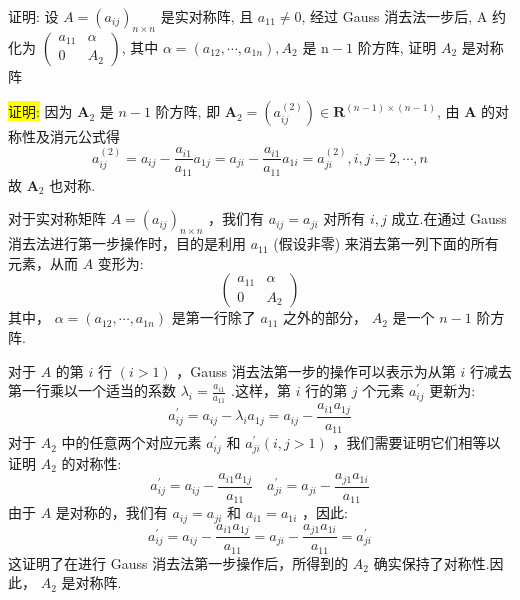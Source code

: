 \begin{tcolorbox}[breakable,enhanced,arc=0mm,outer arc=0mm,
		boxrule=0pt,toprule=1pt,leftrule=0pt,bottomrule=1pt, rightrule=0pt,left=0.2cm,right=0.2cm,
		titlerule=0.5em,toptitle=0.1cm,bottomtitle=-0.1cm,top=0.2cm,
		colframe=white!10!biru,colback=white!90!biru,coltitle=white,
            coltext=black,title =2024-04-02, title style={white!10!biru}, before skip=8pt, after skip=8pt,before upper=\hspace{2em},
		fonttitle=\bfseries,fontupper=\normalsize]
  
证明: 设 $ A=\left(a_{i j}\right)_{n \times n} $ 是实对称阵, 且 $ a_{11} \neq 0 $, 经过 Gauss 消去法一步后, A 约化为 $ \left(\begin{array}{cc}a_{11} & \alpha \\ 0 & A_{2}\end{array}\right) $, 其中 $ \alpha=\left(a_{12}, \cdots, a_{1 n}\right), A_{2} $ 是 $ \mathrm{n}-1 $ 阶方阵, 证明 $ A_{2} $ 是对称阵


\colorbox{yellow}{证明:} 因为 $ \boldsymbol{A}_{2} $ 是 $ n-1 $ 阶方阵, 即 $ \boldsymbol{A}_{2}=\left(a_{i j}^{(2)}\right) \in \mathbf{R}^{(n-1) \times(n-1)} $, 由 $ \boldsymbol{A} $ 的对称性及消元公式得
$$
a_{i j}^{(2)}=a_{i j}-\frac{a_{i 1}}{a_{11}} a_{1 j}=a_{j i}-\frac{a_{i 1}}{a_{11}} a_{1 i}=a_{j i}^{(2)}, i, j=2, \cdots, n
$$
故 $ \boldsymbol{A}_{2} $ 也对称.

 \tcblower

对于实对称矩阵 $ A=\left(a_{i j}\right)_{n \times n} $ ，我们有 $ a_{i j}=a_{j i} $ 对所有 $ i, j $ 成立.在通过 Gauss 消去法进行第一步操作时，目的是利用 $ a_{11} $ (假设非零) 来消去第一列下面的所有元素，从而 $ A $ 变形为:
$$
\left(\begin{array}{cc}
a_{11} & \alpha \\
0 & A_{2}
\end{array}\right)
$$
其中， $ \alpha=\left(a_{12}, \cdots, a_{1 n}\right) $ 是第一行除了 $ a_{11} $ 之外的部分， $ A_{2} $ 是一个 $ n-1 $ 阶方阵.

对于 $ A $ 的第 $ i $ 行 $ (i>1) $ ，Gauss 消去法第一步的操作可以表示为从第 $ i $ 行减去第一行乘以一个适当的系数 $ \lambda_{i}=\frac{a_{i 1}}{a_{11}} $ .这样，第 $ i $ 行的第 $ j $ 个元素 $ a_{i j}^{\prime} $ 更新为:
$$
a_{i j}^{\prime}=a_{i j}-\lambda_{i} a_{1 j}=a_{i j}-\frac{a_{i 1} a_{1 j}}{a_{11}}
$$
对于 $ A_{2} $ 中的任意两个对应元素 $ a_{i j}^{\prime} $ 和 $ a_{j i}^{\prime}(i, j>1) $ ，我们需要证明它们相等以证明 $ A_{2} $ 的对称性:
$$
a_{i j}^{\prime}=a_{i j}-\frac{a_{i 1} a_{1 j}}{a_{11}} \quad
a_{j i}^{\prime}=a_{j i}-\frac{a_{j 1} a_{1 i}}{a_{11}}
$$
由于 $ A $ 是对称的，我们有 $ a_{i j}=a_{j i} $ 和 $ a_{i 1}=a_{1 i} $ ，因此:
$$
a_{i j}^{\prime}=a_{i j}-\frac{a_{i 1} a_{1 j}}{a_{11}}=a_{j i}-\frac{a_{j 1} a_{1 i}}{a_{11}}=a_{j i}^{\prime}
$$
这证明了在进行 Gauss 消去法第一步操作后，所得到的 $ A_{2} $ 确实保持了对称性.因此， $ A_{2} $ 是对称阵.
\end{tcolorbox}

